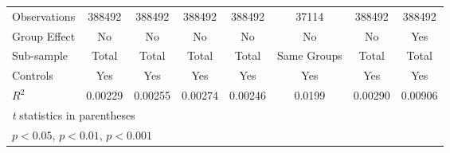 {\begin{tabular}{l*{7}{c}}
\hline
Observations    &   388492         &   388492         &   388492         &   388492         &    37114         &   388492         &   388492         \\
Group Effect    &       No         &       No         &       No         &       No         &       No         &       No         &      Yes         \\
Sub-sample      &    Total         &    Total         &    Total         &    Total         &Same Groups         &    Total         &    Total         \\
Controls        &      Yes         &      Yes         &      Yes         &      Yes         &      Yes         &      Yes         &      Yes         \\
$ R^2 $         &  0.00229         &  0.00255         &  0.00274         &  0.00246         &   0.0199         &  0.00290         &  0.00906         \\
\hline\hline
\multicolumn{8}{l}{\footnotesize \textit{t} statistics in parentheses}\\
\multicolumn{8}{l}{\footnotesize \sym{*} \(p<0.05\), \sym{**} \(p<0.01\), \sym{***} \(p<0.001\)}\\
\end{tabular}
}
